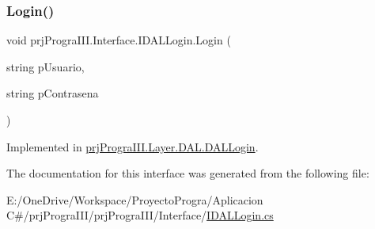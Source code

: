 \subsubsection{\texorpdfstring{Login()}{Login()}}
{\footnotesize\ttfamily void prj\+Progra\+I\+I\+I.\+Interface.\+I\+D\+A\+L\+Login.\+Login (\begin{DoxyParamCaption}\item[{string}]{p\+Usuario,  }\item[{string}]{p\+Contrasena }\end{DoxyParamCaption})}



Implemented in \hyperlink{classprj_progra_i_i_i_1_1_layer_1_1_d_a_l_1_1_d_a_l_login_a2c7ffe6eec7104cf55cb7e7b63ba1ce1}{prj\+Progra\+I\+I\+I.\+Layer.\+D\+A\+L.\+D\+A\+L\+Login}.



The documentation for this interface was generated from the following file\+:\begin{DoxyCompactItemize}
\item 
E\+:/\+One\+Drive/\+Workspace/\+Proyecto\+Progra/\+Aplicacion C\#/prj\+Progra\+I\+I\+I/prj\+Progra\+I\+I\+I/\+Interface/\hyperlink{_i_d_a_l_login_8cs}{I\+D\+A\+L\+Login.\+cs}\end{DoxyCompactItemize}
